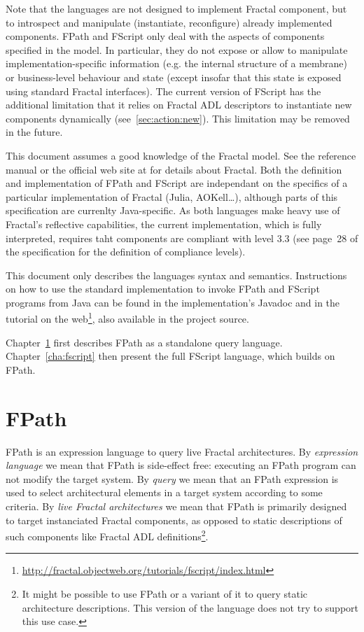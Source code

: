 \documentclass[a4paper,12pt]{report}
\begin{document}
Note that the languages are not designed to implement Fractal component, but to introspect
and manipulate (instantiate, reconfigure) already implemented components. FPath and
FScript only deal with the aspects of components specified in the model. In particular,
they do not expose or allow to manipulate implementation-specific information (e.g. the
internal structure of a membrane) or business-level behaviour and state (except insofar
that this state is exposed using standard Fractal interfaces). The current version of
FScript has the additional limitation that it relies on Fractal ADL descriptors to
instantiate new components dynamically (see~\ref{sec:action:new}). This limitation may be
removed in the future.

This document assumes a good knowledge of the Fractal model. See the reference manual
\citep{bruneton-coupaye-stefani.ow2003} or the official web site at
 for details about Fractal. Both the definition and
implementation of FPath and FScript are independant on the specifics of a particular
implementation of Fractal (Julia, AOKell\dots), although parts of this specification are
currenlty Java-specific. As both languages make heavy use of Fractal's reflective
capabilities, the current implementation, which is fully interpreted, requires taht
components are compliant with level 3.3 (see page~28 of the specification for the
definition of compliance levels).

This document only describes the languages syntax and semantics. Instructions on how to
use the standard implementation to invoke FPath and FScript programs from Java can be
found in the implementation's Javadoc and in the tutorial on the
web\footnote{\url{http://fractal.objectweb.org/tutorials/fscript/index.html}}, also
available in the project source.

Chapter~\ref{cha:fpath} first describes FPath as a standalone query language.
Chapter~\ref{cha:fscript} then present the full FScript language, which builds on FPath.

\chapter{FPath}
\label{cha:fpath}

FPath is an expression language to query live Fractal architectures. By \emph{expression
  language} we mean that FPath is side-effect free: executing an FPath program can not
modify the target system. By \emph{query} we mean that an FPath expression is used to
select architectural elements in a target system according to some criteria. By \emph{live
  Fractal architectures} we mean that FPath is primarily designed to target instanciated
Fractal components, as opposed to static descriptions of such components like Fractal ADL
definitions\footnote{It might be possible to use FPath or a variant of it to query static
  architecture descriptions. This version of the language does not try to support this use
  case.}.
\end{document}
